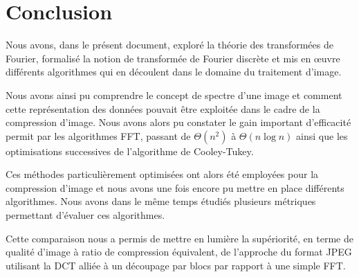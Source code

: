 \section{Conclusion}

Nous avons, dans le présent document, exploré la théorie des transformées de Fourier, formalisé la notion de transformée de Fourier discrète et mis en \oe uvre différents algorithmes qui en découlent dans le domaine du traitement d'image.

Nous avons ainsi pu comprendre le concept de spectre d'une image et comment cette représentation des données pouvait être exploitée dans le cadre de la compression d'image. Nous avons alors pu constater le gain important d'efficacité permit par les algorithmes FFT, passant de $\Theta \left( n^2 \right)$ à $\Theta \left( n \log n \right)$ ainsi que les optimisations successives de l'algorithme de Cooley-Tukey.

Ces méthodes particulièrement optimisées ont alors été employées pour la compression d'image et nous avons une fois encore pu mettre en place différents algorithmes. Nous avons dans le même temps étudiés plusieurs métriques permettant d'évaluer ces algorithmes.

Cette comparaison nous a permis de mettre en lumière la supériorité, en terme de qualité d'image à ratio de compression équivalent, de l'approche du format JPEG utilisant la DCT alliée à un découpage par blocs par rapport à une simple FFT.